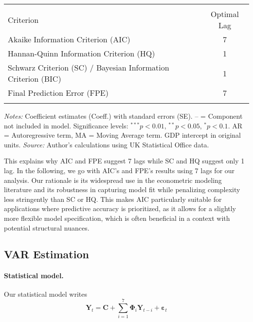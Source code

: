 \documentclass[
]{article}
\let\oldtable\table
\let\endoldtable\endtable
\renewenvironment{table}[1][H]{\oldtable[H]}{\endoldtable}
\begin{document}
\begin{table}[ht]
\centering
\begin{threeparttable}
\caption{\textsc{Optimal Lag Selection Based on Information Criteria}}\label{fig:lagselection}
\begin{tabular}{lc}
 \\[-1.8ex]  \hline \hline  \\[-1.8ex] 
{Criterion} & {Optimal Lag} \\
\midrule
 Akaike Information Criterion (AIC) & 7 \\
Hannan-Quinn Information Criterion (HQ)  & 1 \\
Schwarz Criterion (SC) / Bayesian Information Criterion (BIC)  & 1 \\
Final Prediction Error (FPE) & 7 \\
\hline \hline  \\[-1.8ex] 
\end{tabular}
\end{threeparttable}
\begin{minipage}{\textwidth}
\footnotesize
\textit{Notes:} Coefficient estimates (Coeff.) with standard errors (SE). 
{--} = Component not included in model. Significance levels: $^{***}p<0.01$, $^{**}p<0.05$, $^{*}p<0.1$. 
AR = Autoregressive term, MA = Moving Average term. GDP intercept in original units. 
\textit{Source:} Author's calculations using UK Statistical Office data.
\end{minipage}
\end{table}
This explains why AIC and FPE suggest
7 lags while SC and HQ suggest only 1 lag. In the following, we go with AIC’s and 
FPE’s results using 7 lags for our analysis. Our rationale is its widespread 
use in the econometric modeling literature and its 
robustness in capturing model fit while penalizing complexity less stringently 
than SC or HQ. This makes AIC  particularly suitable for applications 
where predictive accuracy is prioritized, as it allows for a slightly more 
flexible model specification, which is often beneficial in a context 
with potential structural nuances.

\subsection{VAR Estimation}

\paragraph*{Statistical model.}
Our statistical model writes
\begin{equation*}
\bm{Y}_t = \bm{C} + \sum_{i=1}^7 \bm{\Phi}_i \bm{Y}_{t-i} + \bm{\varepsilon}_t
\end{equation*}
\end{document}
